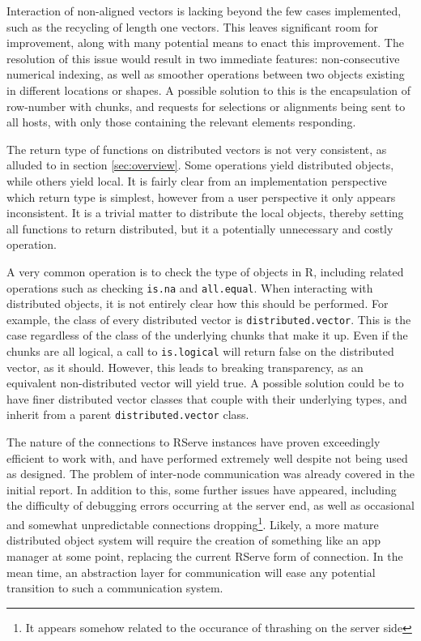 \documentclass[a4paper,10pt]{article}
\begin{document}
Interaction of non-aligned vectors is lacking beyond the few cases implemented,
such as the recycling of length one vectors. 
This leaves significant room for improvement, along with many potential means
to enact this improvement.
The resolution of this issue would result in two immediate features:
non-consecutive numerical indexing, as well as smoother operations between two
objects existing in different locations or shapes.
A possible solution to this is the encapsulation of row-number with chunks,
and requests for selections or alignments being sent to all hosts, with only
those containing the relevant elements responding.

The return type of functions on distributed vectors is not very consistent, as
alluded to in section \ref{sec:overview}.
Some operations yield distributed objects, while others yield local.
It is fairly clear from an implementation perspective which return type is
simplest, however from a user perspective it only appears inconsistent.
It is a trivial matter to distribute the local objects, thereby setting all
functions to return distributed, but it a potentially unnecessary and costly
operation.

A very common operation is to check the type of objects in R, including
related operations such as checking \texttt{is.na} and \texttt{all.equal}.
When interacting with distributed objects, it is not entirely clear how
this should be performed.
For example, the class of every distributed vector is
\texttt{distributed.vector}.
This is the case regardless of the class of the underlying chunks that make it
up.
Even if the chunks are all logical, a call to \texttt{is.logical} will return
false on the distributed vector, as it should.
However, this leads to breaking transparency, as an equivalent non-distributed
vector will yield true.
A possible solution could be to have finer distributed vector classes that
couple with their underlying types, and inherit from a parent
\texttt{distributed.vector} class.

The nature of the connections to RServe instances have proven exceedingly
efficient to work with, and have performed extremely well despite not being
used as designed.
The problem of inter-node communication was already covered in the initial
report.
In addition to this, some further issues have appeared, including the
difficulty of debugging errors occurring at the server end, as well as
occasional and somewhat unpredictable connections dropping\footnote{It appears
somehow related to the occurance of thrashing on the server side}.
Likely, a more mature distributed object system will require the creation of
something like an app manager at some point, replacing the current RServe
form of connection.
In the mean time, an abstraction layer for communication will ease any
potential transition to such a communication system.
\end{document}
